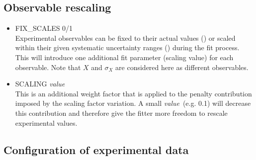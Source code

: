 \documentclass[a4paper,10pt]{article}
\def\tt{\ttfamily}
\def\rm{\rmfamily}
\begin{document}
\subsection{Observable rescaling}

\begin{itemize}
\item
\tt FIX\_SCALES 0/1\rm\\
Experimental observables can be fixed to their actual values (\tt1\rm) or scaled within their given systematic uncertainty ranges (\tt0\rm)
during the fit process. This will introduce one additional fit parameter (scaling value) for each observable.
Note that $X$ and $\sigma_X$ are considered here as different observables.

\item
\tt SCALING \textit{value}\rm\\
This is an additional weight factor that is applied to the penalty contribution imposed by the scaling factor variation.
A small \tt\textit{value}\rm\ (e.g. 0.1) will decrease this contribution and therefore
give the fitter more freedom to rescale experimental values.
\end{itemize}

\subsection{Configuration of experimental data}
\end{document}
